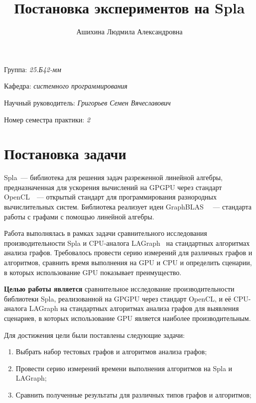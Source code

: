 \documentclass[a4paper]{article}
\title{Постановка экспериментов на Spla}
\author{Ашихина Людмила Александровна}
\date{}
\begin{document}
	
	\maketitle
	
	\begin{flushright}
		Группа: \emph{25.Б42-мм} 
		
		Кафедра: \emph{системного программирования}
		
		Научный руководитель: \emph{Григорьев Семен Вячеславович}
		
		
		Номер семестра практики: \emph{2}
	\end{flushright} 
	
	\section{Постановка задачи}
	
	Spla~--- \cite{spla}  библиотека для решения задач разреженной линейной алгебры, предназначенная для ускорения вычислений на GPGPU через стандарт OpenCL~\cite{OpenCl}~--- открытый стандарт для программирования разнородных вычислительных систем. Библиотека реализует идеи GraphBLAS~\cite{GraphBlas} ~--- стандарта работы с графами с помощью линейной алгебры.
	
	Работа выполнялась в рамках задачи сравнительного исследования производительности Spla и CPU-аналога LAGraph~\cite{LAGraph}  на стандартных алгоритмах анализа графов. Требовалось провести серию измерений для различных графов и алгоритмов, сравнить время выполнения на GPU и CPU и определить сценарии, в которых использование GPU показывает преимущество.
	
	\textbf{Целью работы является} сравнительное исследование производительности библиотеки Spla, реализованной на GPGPU через стандарт OpenCL, и её CPU-аналога LAGraph на стандартных алгоритмах анализа графов для выявления сценариев, в которых использование GPU является наиболее производительным.
	
	Для достижения цели были поставлены следующие задачи:
	\begin{enumerate}
		\item Выбрать набор тестовых графов и алгоритмов анализа графов;
		\item Провести серию измерений времени выполнения алгоритмов на Spla и LAGraph;
		\item Сравнить полученные результаты для различных типов графов и алгоритмов;
	\end{enumerate}
	
\end{document}
